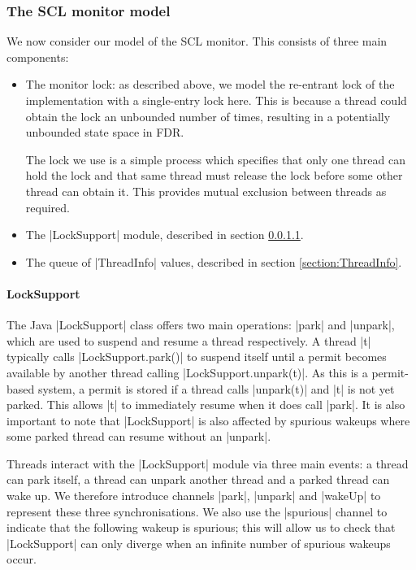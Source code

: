 \subsubsection{The SCL monitor model}


We now consider our model of the SCL monitor. This consists of three main components: 
\begin{itemize}
  \item The monitor lock: as described above, we model the re-entrant lock of the implementation with a single-entry lock here. This is because a thread could obtain the lock an unbounded number of times, resulting in a potentially unbounded state space in FDR. 
  
  The lock we use is a simple process  which specifies that only one thread can hold the lock and that same thread must release the lock before some other thread can obtain it. This provides mutual exclusion between threads as required.
  \item The |LockSupport| module, described in section \ref{section:LockSupport}.
  \item The queue of |ThreadInfo| values, described in section \ref{section:ThreadInfo}.
\end{itemize}

\paragraph{LockSupport}\label{section:LockSupport}

The Java |LockSupport| \cite{LockSupport} class offers two main operations: |park| and |unpark|, which are used to suspend and resume a thread respectively. A thread |t| typically calls |LockSupport.park()| to suspend itself until a permit becomes available by another thread calling |LockSupport.unpark(t)|. As this is a permit-based system, a permit is stored if a thread calls |unpark(t)| and |t| is not yet parked. This allows |t| to immediately resume when it does call |park|.
It is also important to note that |LockSupport| is also affected by spurious wakeups where some parked thread can resume without an |unpark|. 

Threads interact with the |LockSupport| module via three main events: a thread can park itself, a thread can unpark another thread and a parked thread can wake up. We therefore introduce channels |park|, |unpark| and |wakeUp| to represent these three synchronisations. We also use the |spurious| channel to indicate that the following wakeup is spurious; this will allow us to check that |LockSupport| can only diverge when an infinite number of spurious wakeups occur.

